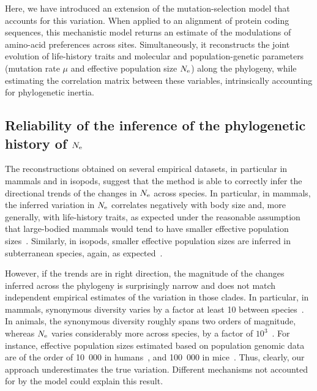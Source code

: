 \documentclass{article}
\begin{document}
    Here, we have introduced an extension of the mutation-selection model that accounts for this variation.
    When applied to an alignment of protein coding sequences, this mechanistic model returns an estimate of the modulations of amino-acid preferences across sites.
    Simultaneously, it reconstructs the joint evolution of life-history traits and molecular and population-genetic parameters (mutation rate $\mu$ and {effective population size} $N_{\text{e}}$) along the phylogeny, while estimating the correlation matrix between these variables, intrinsically accounting for phylogenetic inertia.

    \subsection{Reliability of the inference of the phylogenetic history of $N_{\text{e}}$}

    The reconstructions obtained on several empirical datasets, in particular in mammals and in isopods, suggest that the method is able to correctly infer the directional trends of the changes in $N_{\text{e}}$ across species.
    In particular, in mammals, the inferred variation in $N_{\text{e}}$ correlates negatively with body size and, more generally, with life-history traits, as expected under the reasonable assumption that large-bodied mammals would tend to have smaller effective population sizes~\cite{Popadin2007,Lartillot2012,Nabholz2013,Figuet2017}.
    Similarly, in isopods, smaller effective population sizes are inferred in subterranean species, again, as expected~\citep{Capderrey2013}.

    However, if the trends are in right direction, the magnitude of the changes inferred across the phylogeny is surprisingly narrow and does not match independent empirical estimates of the variation in those clades.
    In particular, in mammals, {synonymous} diversity varies by a factor at least 10 between species~\citep{Galtier2016}.
    In animals, the {synonymous} diversity roughly spans two orders of magnitude, whereas $N_{\text{e}}$ varies considerably more across species, by a factor of $10^3$~\citep{Galtier2019}.
    For instance, effective population sizes estimated based on population genomic data are of the order of 10~000 in humans~\citep{Li2011}, and 100~000 in mice~\citep{Geraldes2008}.
    Thus, clearly, our approach underestimates the true variation.
    Different mechanisms not accounted for by the model could explain this result.
\end{document}
